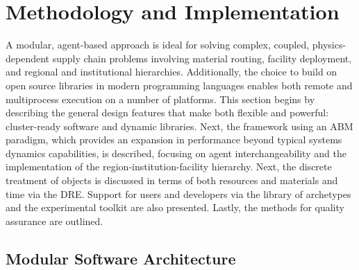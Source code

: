 \section{Methodology and Implementation}

A modular, agent-based approach is ideal for solving complex, coupled,
physics-dependent supply chain problems involving material routing, facility
deployment, and regional and institutional hierarchies. Additionally, the choice to 
build \Cyclus on open source libraries in modern programming languages enables 
both remote and multiprocess execution on a number of platforms. This section begins by 
describing the general design features that make \Cyclus both flexible and powerful:
cluster-ready software and dynamic libraries.  Next, the framework using an
\gls{ABM} paradigm, which provides an expansion in performance beyond typical systems dynamics
capabilities, is described, focusing on agent interchangeability and the 
implementation of the region-institution-facility hierarchy. 
Next, the discrete treatment of objects is discussed in terms of both
resources and materials and time via the \gls{DRE}.
Support for users and developers via the \Cycamore library of
archetypes and the experimental toolkit are also presented.
Lastly, the methods for quality assurance are outlined.

\subsection{Modular Software Architecture}

